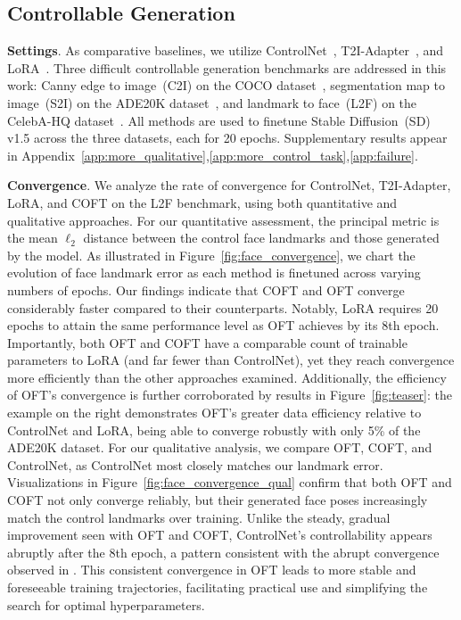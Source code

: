 \subsection{Controllable Generation}

\textbf{Settings}. As comparative baselines, we utilize ControlNet~\cite{zhang2023adding}, T2I-Adapter~\cite{mou2023t2i}, and LoRA~\cite{hulora2022}. Three difficult controllable generation benchmarks are addressed in this work: Canny edge to image~(C2I) on the COCO dataset~\cite{lin2014microsoft}, segmentation map to image~(S2I) on the ADE20K dataset~\cite{zhou2017scene}, and landmark to face~(L2F) on the CelebA-HQ dataset~\cite{karras2018progressive,xia2021tedigan}. All methods are used to finetune Stable Diffusion~(SD) v1.5 across the three datasets, each for 20 epochs. Supplementary results appear in Appendix~\ref{app:more_qualitative},\ref{app:more_control_task},\ref{app:failure}.

\textbf{Convergence}. We analyze the rate of convergence for ControlNet, T2I-Adapter, LoRA, and COFT on the L2F benchmark, using both quantitative and qualitative approaches. For our quantitative assessment, the principal metric is the mean $\ell_2$ distance between the control face landmarks and those generated by the model. As illustrated in Figure~\ref{fig:face_convergence}, we chart the evolution of face landmark error as each method is finetuned across varying numbers of epochs. Our findings indicate that COFT and OFT converge considerably faster compared to their counterparts. Notably, LoRA requires 20 epochs to attain the same performance level as OFT achieves by its 8th epoch. Importantly, both OFT and COFT have a comparable count of trainable parameters to LoRA (and far fewer than ControlNet), yet they reach convergence more efficiently than the other approaches examined. Additionally, the efficiency of OFT’s convergence is further corroborated by results in Figure~\ref{fig:teaser}: the example on the right demonstrates OFT’s greater data efficiency relative to ControlNet and LoRA, being able to converge robustly with only 5\% of the ADE20K dataset. For our qualitative analysis, we compare OFT, COFT, and ControlNet, as ControlNet most closely matches our landmark error. Visualizations in Figure~\ref{fig:face_convergence_qual} confirm that both OFT and COFT not only converge reliably, but their generated face poses increasingly match the control landmarks over training. Unlike the steady, gradual improvement seen with OFT and COFT, ControlNet’s controllability appears abruptly after the 8th epoch, a pattern consistent with the abrupt convergence observed in \cite{zhang2023adding}. This consistent convergence in OFT leads to more stable and foreseeable training trajectories, facilitating practical use and simplifying the search for optimal hyperparameters.

